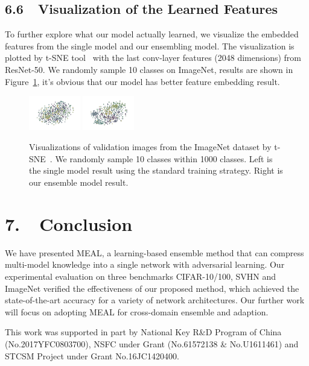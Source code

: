 \documentclass[letterpaper]{article} %
\begin{document}
\subsection{6.6~~Visualization of the Learned Features}
To further explore what our model actually learned, we visualize the embedded features from the single model and our ensembling model. The visualization is plotted by t-SNE tool~\cite{maaten2008visualizing} with the last conv-layer features (2048 dimensions) from ResNet-50. We randomly sample 10 classes on ImageNet, results are shown in Figure~\ref{embedding}, it's obvious that our model has better feature embedding result.

\begin{figure}[t]
	\centering
	\includegraphics[width=0.2\textwidth]{figs/before_new}
	\includegraphics[width=0.2\textwidth]{figs/after2_new}
	\vspace{-0.1in}
	\caption{Visualizations of validation images from the ImageNet dataset by t-SNE~\cite{maaten2008visualizing}. We randomly sample 10 classes within 1000 classes. Left is the single model result using the standard training strategy. Right is our ensemble model result.}
	\label{embedding}
	\vspace{-0.1in}
\end{figure}

\section{7.~~Conclusion}
We have presented MEAL, a learning-based ensemble method that can compress multi-model knowledge into a single network with adversarial learning. Our experimental evaluation on three benchmarks CIFAR-10/100, SVHN and ImageNet verified the effectiveness of our proposed method, which achieved the state-of-the-art accuracy for a variety of network architectures. Our further work will focus on adopting MEAL for cross-domain ensemble and adaption.

\vspace{0.1in}
This work was supported in part by National Key R\&D Program of China (No.2017YFC0803700),
NSFC under Grant (No.61572138 \& No.U1611461) and STCSM Project under Grant No.16JC1420400.
{\small
	
	
}
\end{document}
